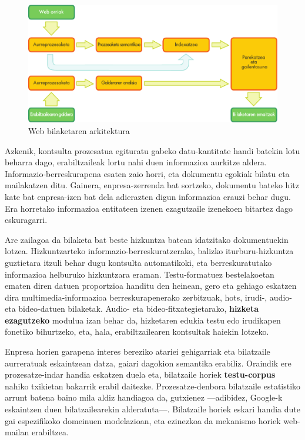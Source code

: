 \begin{multicols}{2}
\begin{figure}[htb]
  \center
  \includegraphics[width=\textwidth]{../_media/basque/web_search_architecture}
  \vspace{-5mm}
  \caption{Web bilaketaren arkitektura}
  \label{fig:websearcharch_eu}
\end{figure}

Azkenik, kontsulta prozesatua egituratu gabeko datu-kantitate handi batekin lotu beharra dago, erabiltzaileak lortu nahi duen informazioa aurkitze aldera. Informazio-berreskurapena esaten zaio horri, eta dokumentu egokiak bilatu eta mailakatzen ditu. Gainera, enpresa-zerrenda bat sortzeko, dokumentu bateko hitz kate bat enpresa-izen bat dela adierazten digun informazioa erauzi behar dugu. Era horretako informazioa entitateen izenen ezagutzaile izenekoen bitartez dago eskuragarri. 

Are zailagoa da bilaketa bat beste hizkuntza batean idatzitako dokumentuekin lotzea. Hizkuntzarteko informazio-berreskuratzerako, balizko iturburu-hizkuntza guztietara itzuli behar dugu kontsulta automatikoki, eta berreskuratutako informazioa helburuko hizkuntzara eraman. Testu-formatuez bestelakoetan ematen diren datuen proportzioa handitu den heinean, gero eta gehiago eskatzen dira multimedia-informazioa berreskurapenerako zerbitzuak, hots, irudi-, audio- eta bideo-datuen bilaketak. Audio- eta bideo-fitxategietarako, \textbf{hizketa ezagutzeko} modulua izan behar da, hizketaren edukia testu edo irudikapen fonetiko bihurtzeko, eta, hala, erabiltzailearen kontsultak haiekin lotzeko.

Enpresa horien garapena interes bereziko atariei gehigarriak eta bilatzaile aurreratuak eskaintzean datza, gaiari dagokion semantika erabiliz. Oraindik ere prozesatze-indar handia eskatzen duela eta, bilatzaile horiek \textbf{testu-corpus} nahiko txikietan bakarrik erabil daitezke. Prozesatze-denbora bilatzaile estatistiko arrunt batena baino mila aldiz handiagoa da, gutxienez —adibidez, Google-k eskaintzen duen bilatzailearekin alderatuta—. Bilatzaile horiek eskari handia dute gai espezifikoko domeinuen modelazioan, eta ezinezkoa da mekanismo horiek web-mailan erabiltzea.


\end{multicols}
